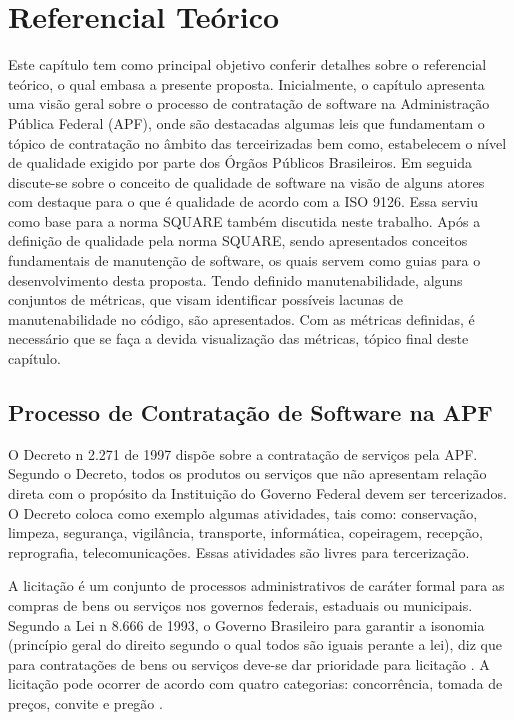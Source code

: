 
\chapter[Referencial Teórico]{Referencial Teórico}	
Este capítulo tem como principal objetivo conferir detalhes sobre o referencial teórico, o qual embasa a presente proposta.    Inicialmente, o capítulo apresenta uma visão geral sobre o processo de contratação de software na Administração Pública Federal (APF), onde são destacadas algumas leis que fundamentam o tópico de contratação no âmbito das terceirizadas bem como, estabelecem o nível de qualidade exigido por parte dos Órgãos Públicos Brasileiros. Em seguida discute-se sobre o conceito de qualidade de software na visão de alguns atores com destaque para o que é qualidade de acordo com a ISO 9126. Essa serviu como base para a norma SQUARE também discutida neste trabalho. Após a definição de qualidade pela norma SQUARE, sendo apresentados conceitos fundamentais de manutenção de software, os quais servem como guias para o desenvolvimento desta proposta. Tendo definido manutenabilidade, alguns conjuntos de métricas, que visam identificar possíveis lacunas de manutenabilidade no código, são apresentados. Com as métricas definidas, é necessário que se faça a devida visualização das métricas, tópico final deste capítulo.
	
\section{Processo de Contratação de Software na APF}
O Decreto n 2.271 de 1997 \cite{decreto_2271} dispõe sobre a contratação de serviços pela APF. Segundo o Decreto, todos os produtos ou serviços que não apresentam relação direta com o propósito da Instituição do Governo Federal devem ser tercerizados. O Decreto coloca como exemplo algumas atividades, tais como: conservação, limpeza, segurança, vigilância, transporte, informática, copeiragem, recepção, reprografia, telecomunicações. Essas atividades são livres para tercerização.

A licitação é um conjunto de processos administrativos de caráter formal para as compras de bens ou serviços nos governos federais, estaduais ou municipais. Segundo a Lei  n 8.666 de 1993, o Governo Brasileiro para garantir a isonomia (princípio geral do direito segundo o qual todos são iguais perante a lei), diz que para contratações de bens ou serviços deve-se dar prioridade para licitação \cite{Lei_1993}. A licitação pode ocorrer de acordo com quatro categorias: concorrência, tomada de preços, convite e pregão \cite{brazil_licitacoes_2010}.

